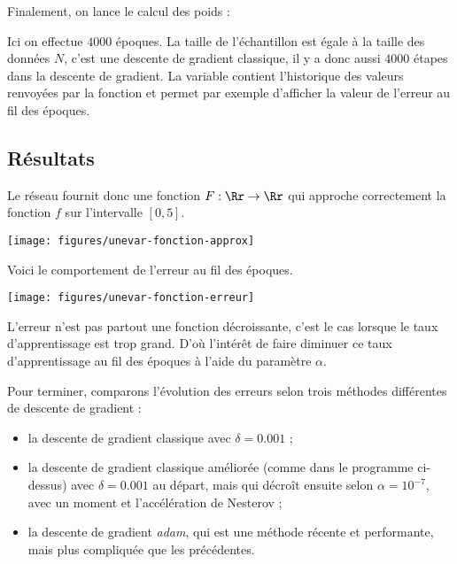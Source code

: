 \documentclass[11pt,class=report,crop=false]{standalone}
\begin{document}
Finalement, on lance le calcul des poids : 

Ici on effectue $4000$ époques. La taille de l'échantillon est égale à la taille des données $N$, c'est une descente de gradient classique, il y a donc aussi $4000$ étapes dans la descente de gradient.
La variable  contient l'historique des valeurs renvoyées par la fonction  et permet par exemple d'afficher la valeur de l'erreur au fil des époques.



\subsection{Résultats}

Le réseau fournit donc une fonction $F : \Rr \to \Rr$ qui approche correctement la fonction $f$ sur l'intervalle $[0,5]$.
\begin{center}
\texttt{[image: figures/unevar-fonction-approx]}
\end{center}

Voici le comportement de l'erreur au fil des époques.
\begin{center}
\texttt{[image: figures/unevar-fonction-erreur]}
\end{center}

L'erreur n'est pas partout une fonction décroissante, c'est le cas lorsque le taux d'apprentissage est trop grand. D'où l'intérêt de faire diminuer ce taux d'apprentissage au fil des époques à l'aide du paramètre $\alpha$.

Pour terminer, comparons l'évolution des erreurs selon trois méthodes différentes de descente de gradient :
\begin{itemize}
  \item la descente de gradient classique avec $\delta = 0.001$ ;
  \item la descente de gradient classique  améliorée (comme dans le programme ci-dessus) avec $\delta = 0.001$ au départ, mais qui décroît ensuite selon $\alpha = 10^{-7}$, avec un moment et l'accélération de Nesterov ;
  \item la descente de gradient \og{}\emph{adam}\fg{}, qui est une méthode récente et performante, mais plus compliquée que les précédentes.
\end{itemize}
\end{document}
